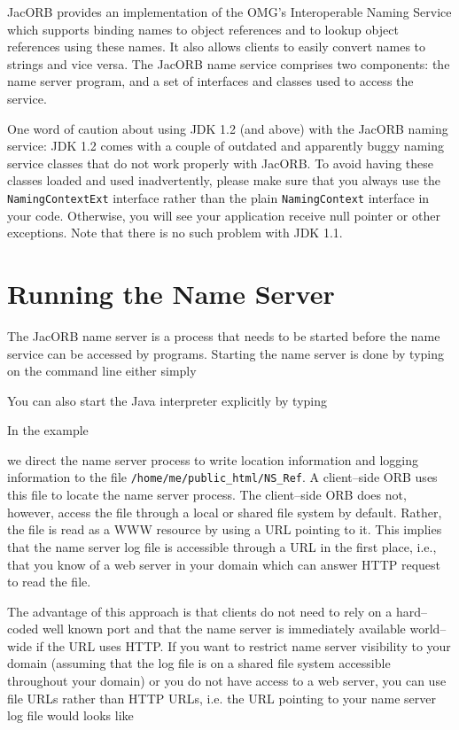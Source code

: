 \documentclass[12pt]{scrbook}
\begin{document}
JacORB provides  an implementation  of the OMG's  Interoperable Naming
Service  which supports  binding  names to  object  references and  to
lookup object references using these names.  It also allows clients to
easily  convert names  to  strings  and vice  versa.  The JacORB  name
service comprises two  components: the name server program,  and a set
of interfaces and classes used to access the service.

One word  of caution about using  JDK 1.2 (and above)  with the JacORB
naming service: JDK 1.2 comes with a couple of outdated and apparently
buggy naming service classes that do not work properly with JacORB. To
avoid having these classes  loaded and used inadvertently, please make
sure that  you always use the {\tt  NamingContextExt} interface rather
than the plain {\tt  NamingContext} interface in your code. Otherwise,
you  will   see  your  application  receive  null   pointer  or  other
exceptions. Note that there is no such problem with JDK 1.1.

\section{Running the Name Server}

The JacORB  name server is a  process that needs to  be started before
the name service can be accessed by programs. Starting the name server
is done by typing on the command line either simply


You can also start the Java interpreter explicitly by typing


In the example


we direct  the name server  process to write location  information and
logging information to  the file {\tt /home/me/public\_html/NS\_Ref}.  A
client--side ORB uses this file to locate the name server process. The
client--side ORB does not, however, access the file through a local or
shared file  system by  default.  Rather,  the file is  read as  a WWW
resource by  using a URL pointing  to it.  This implies  that the name
server log file is accessible through  a URL in the first place, i.e.,
that you  know of a  web server in  your domain which can  answer HTTP
request to read the file.

The advantage of this approach is  that clients do not need to rely on
a hard--coded well known port  and that the name server is immediately
available world--wide  if the URL uses  HTTP. If you  want to restrict
name server visibility  to your domain (assuming that  the log file is
on a shared  file system accessible throughout your  domain) or you do
not have  access to a  web server, you  can use file URLs  rather than
HTTP URLs,  i.e. the URL pointing  to your name server  log file would
looks like
\end{document}
